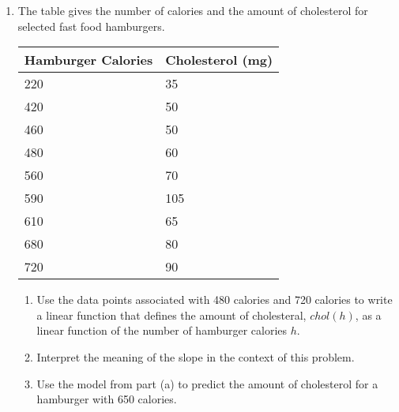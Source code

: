 \begin{enumerate}
\item The table gives the number of calories and the amount of
  cholesterol for selected fast food hamburgers.
  \label{question:1.5:calories}
\begin{table}[h]
  \begin{center}
    \begin{tabular}{|l|l|}
      \hline
      \textbf{Hamburger Calories} & \textbf{Cholesterol (mg)} \\ \hline
      220                         & 35                        \\ \hline
      420                         & 50                        \\ \hline
      460                         & 50                        \\ \hline
      480                         & 60                        \\ \hline
      560                         & 70                        \\ \hline
      590                         & 105                       \\ \hline
      610                         & 65                        \\ \hline
      680                         & 80                        \\ \hline
      720                         & 90                        \\ \hline
    \end{tabular}
  \end{center}
\end{table}
\begin{enumerate}
\item Use the data points associated with 480 calories and 720
  calories to write a linear function that defines the amount of
  cholesteral, $chol(h)$, as a linear function of the number of
  hamburger calories $h$.
  \vfill
\item Interpret the meaning of the slope in the context of this problem.
\vfill
\item Use the model from part (a) to predict the amount of cholesterol for a hamburger with 650 calories.  
\vfill
\end{enumerate}



\end{enumerate}
